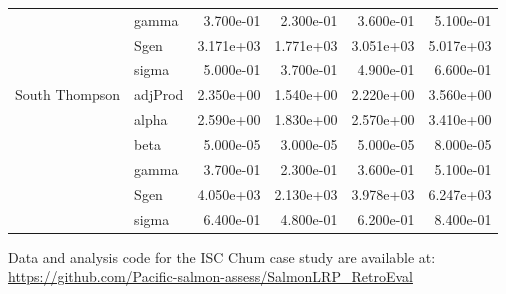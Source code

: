 \documentclass[11pt]{book}
\begin{document}
\begin{longtable}[]{@{}llrrrr@{}}
& gamma & 3.700e-01 & 2.300e-01 & 3.600e-01 & 5.100e-01 \\
& Sgen & 3.171e+03 & 1.771e+03 & 3.051e+03 & 5.017e+03 \\
& sigma & 5.000e-01 & 3.700e-01 & 4.900e-01 & 6.600e-01 \\
South Thompson & adjProd & 2.350e+00 & 1.540e+00 & 2.220e+00 & 3.560e+00 \\
& alpha & 2.590e+00 & 1.830e+00 & 2.570e+00 & 3.410e+00 \\
& beta & 5.000e-05 & 3.000e-05 & 5.000e-05 & 8.000e-05 \\
& gamma & 3.700e-01 & 2.300e-01 & 3.600e-01 & 5.100e-01 \\
& Sgen & 4.050e+03 & 2.130e+03 & 3.978e+03 & 6.247e+03 \\
& sigma & 6.400e-01 & 4.800e-01 & 6.200e-01 & 8.400e-01 \\
\bottomrule
\end{longtable}

\clearpage

\label{app:github-appendix}

Data and analysis code for the ISC Chum case study are available at: \url{https://github.com/Pacific-salmon-assess/SalmonLRP_RetroEval}
\end{document}
